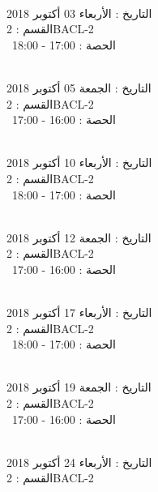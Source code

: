 \documentclass[14pt a4paper twocolumn]{book}
\begin{document}
\noindent\makebox[\linewidth]{\rule{\paperwidth}{0.4pt}}
 \\
التاريخ : الأربعاء 03 أكتوبر 2018 \\
القسم : 2BACL-2 \\
 \  
الحصة : 17:00 - 18:00 \\
\par
\noindent\makebox[\linewidth]{\rule{\paperwidth}{0.4pt}}
 \\
التاريخ : الجمعة 05 أكتوبر 2018 \\
القسم : 2BACL-2 \\
 \  
الحصة : 16:00 - 17:00 \\
\par
\noindent\makebox[\linewidth]{\rule{\paperwidth}{0.4pt}}
 \\
التاريخ : الأربعاء 10 أكتوبر 2018 \\
القسم : 2BACL-2 \\
 \  
الحصة : 17:00 - 18:00 \\
\par
\noindent\makebox[\linewidth]{\rule{\paperwidth}{0.4pt}}
 \\
التاريخ : الجمعة 12 أكتوبر 2018 \\
القسم : 2BACL-2 \\
 \  
الحصة : 16:00 - 17:00 \\
\par
\noindent\makebox[\linewidth]{\rule{\paperwidth}{0.4pt}}
 \\
التاريخ : الأربعاء 17 أكتوبر 2018 \\
القسم : 2BACL-2 \\
 \  
الحصة : 17:00 - 18:00 \\
\par
\noindent\makebox[\linewidth]{\rule{\paperwidth}{0.4pt}}
 \\
التاريخ : الجمعة 19 أكتوبر 2018 \\
القسم : 2BACL-2 \\
 \  
الحصة : 16:00 - 17:00 \\
\par
\noindent\makebox[\linewidth]{\rule{\paperwidth}{0.4pt}}
 \\
التاريخ : الأربعاء 24 أكتوبر 2018 \\
القسم : 2BACL-2 \\
\end{document}
